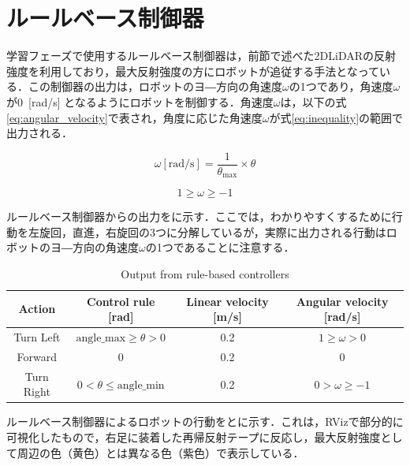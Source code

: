 
\section{ルールベース制御器}

  学習フェーズで使用するルールベース制御器は，前節で述べた2DLiDARの反射強度を利用しており，最大反射強度の方にロボットが追従する手法となっている．この制御器の出力は，ロボットのヨ―方向の角速度$\omega$の1つであり，角速度$\omega$が0 \,[rad/s] となるようにロボットを制御する．角速度$\omega$は，以下の式\eqref{eq:angular_velocity}で表され，角度に応じた角速度$\omega$が式\eqref{eq:inequality}の範囲で出力される．

  \begin{equation}
    \omega[\text{rad/s}] = \frac{1}{\theta_{\text{max}}} \times \theta
    \label{eq:angular_velocity}
    \end{equation}

  \begin{equation}
    1 \geq \omega \geq -1
    \label{eq:inequality}
    \end{equation}

  ルールベース制御器からの出力をに示す．ここでは，わかりやすくするために行動を左旋回，直進，右旋回の3つに分解しているが，実際に出力される行動はロボットのヨ―方向の角速度$\omega$の1つであることに注意する．

  \begin{table}[h]
    \caption{Output from rule-based controllers}
    \label{tab:output_from_rule-based_controllers}
    \begin{tabular}{|c|c|c|c|}
    \hline
    Action & Control rule {[}rad{]} & Linear velocity {[}m/s{]} & Angular velocity {[}rad/s{]} \\ 
    \hline
    Turn Left & $\text{angle\_max} \geq \theta > 0$ & 0.2 & $1 \geq \omega > 0$ \\ 
    \hline
    Forward & $0$ & 0.2 & $0$ \\ 
    \hline
    Turn Right & $0 < \theta \leq \text{angle\_min}$ & 0.2 & $0 > \omega \geq -1$ \\ 
    \hline
    \end{tabular}
    \end{table}

\newpage

  ルールベース制御器によるロボットの行動をとに示す．これは，RVizで部分的に可視化したもので，右足に装着した再帰反射テープに反応し，最大反射強度として周辺の色（黄色）とは異なる色（紫色）で表示している．
  
